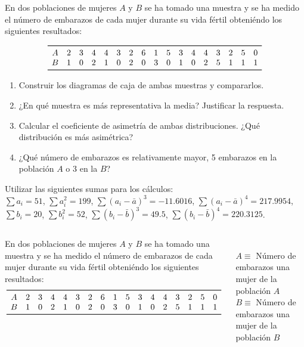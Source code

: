 \documentclass[aspectratio=149,10pt,t]{beamer}
\begin{document}
\begin{frame}[c]
	\large
	En dos poblaciones de mujeres $A$ y $B$ se ha tomado una muestra y se ha medido el número de embarazos de cada mujer durante su vida fértil obteniéndo los siguientes resultados:

	\[
	\begin{array}{ccccccccccccccccc}
	\toprule
	A & 2 & 3 & 4 & 4 & 3 & 2 & 6 & 1 & 5 & 3 & 4 & 4 & 3 & 2 & 5 & 0\\
	B & 1 & 0 & 2 & 1 & 0 & 2 & 0 & 3 & 0 & 1 & 0 & 2 & 5 & 1 & 1 & 1\\
	\bottomrule
	\end{array}
	\]

	\begin{enumerate}
	  \item Construir los diagramas de caja de ambas muestras y compararlos.
	  \item ¿En qué muestra es más representativa la media? Justificar la respuesta.
	  \item Calcular el coeficiente de asimetría de ambas distribuciones.
	  ¿Qué distribución es más asimétrica?
	  \item ¿Qué número de embarazos es relativamente mayor, 5 embarazos en la población $A$ o 3 en la $B$?
	\end{enumerate}

	Utilizar las siguientes sumas para los cálculos:\\
	$\sum a_i=51$, $\sum a_i^2=199$, $\sum (a_i-\bar a)^3=-11.6016$, $\sum (a_i-\bar a)^4=217.9954$,\\
	$\sum b_i=20$, $\sum b_i^2=52$, $\sum (b_i-\bar b)^3=49.5$, $\sum (b_i-\bar b)^4=220.3125$.
\end{frame}


\begin{frame}
	\begin{columns}
		\begin{column}[T]{0.7\textwidth}
			En dos poblaciones de mujeres $A$ y $B$ se ha tomado una muestra y se ha medido el número de embarazos de cada mujer durante su vida fértil obteniéndo los siguientes resultados:
			\[
			\begin{array}{ccccccccccccccccc}
			\toprule
			A & 2 & 3 & 4 & 4 & 3 & 2 & 6 & 1 & 5 & 3 & 4 & 4 & 3 & 2 & 5 & 0\\
			B & 1 & 0 & 2 & 1 & 0 & 2 & 0 & 3 & 0 & 1 & 0 & 2 & 5 & 1 & 1 & 1\\
			\bottomrule
			\end{array}
			\]
		\end{column}
		\begin{column}[T]{0.3\textwidth}
			\\
			$A\equiv$ Número de embarazos una mujer de la población $A$\\
			$B\equiv$ Número de embarazos una mujer de la población $B$\\
		\end{column}
	\end{columns}
\end{frame}
\end{document}
